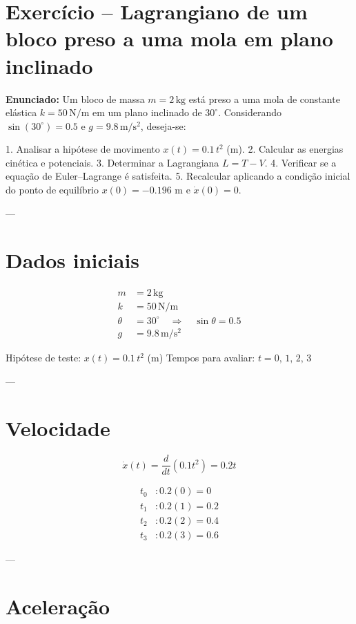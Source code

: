 \documentclass[a4paper,12pt]{article}
\begin{document}
\section*{Exercício – Lagrangiano de um bloco preso a uma mola em plano inclinado}

\textbf{Enunciado:}  
Um bloco de massa $m = 2\,\mathrm{kg}$ está preso a uma mola de constante elástica $k = 50\,\mathrm{N/m}$ em um plano inclinado de $30^\circ$.  
Considerando $\sin(30^\circ) = 0.5$ e $g = 9.8\,\mathrm{m/s^2}$, deseja-se:

1. Analisar a hipótese de movimento $x(t) = 0.1\,t^2$ (m).  
2. Calcular as energias cinética e potenciais.  
3. Determinar a Lagrangiana $L = T - V$.  
4. Verificar se a equação de Euler–Lagrange é satisfeita.  
5. Recalcular aplicando a condição inicial do ponto de equilíbrio $x(0) = -0.196$ m e $\dot{x}(0) = 0$.

---

\section*{Dados iniciais}

\begin{align*}
m &= 2\,\mathrm{kg} \\
k &= 50\,\mathrm{N/m} \\
\theta &= 30^\circ \quad \Rightarrow \quad \sin\theta = 0.5 \\
g &= 9.8\,\mathrm{m/s^2}
\end{align*}

Hipótese de teste: $x(t) = 0.1\,t^2$ (m)  
Tempos para avaliar: $t = 0,\,1,\,2,\,3$

---

\section*{Velocidade}

\[
\dot{x}(t) = \frac{d}{dt}(0.1t^2) = 0.2t
\]

\begin{align*}
t_0 &: 0.2(0) = 0 \\
t_1 &: 0.2(1) = 0.2 \\
t_2 &: 0.2(2) = 0.4 \\
t_3 &: 0.2(3) = 0.6
\end{align*}

---

\section*{Aceleração}
\end{document}
